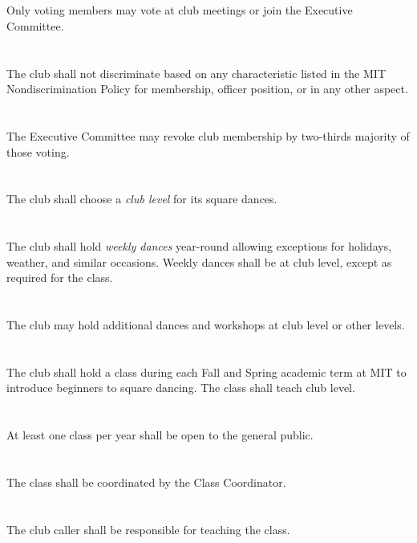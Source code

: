 \documentclass{bylaws}
\begin{document}
\section{}Only voting members may vote at club meetings or join the Executive Committee.
\section{}The club shall not discriminate based on any characteristic listed in the MIT Nondiscrimination Policy for membership, officer position, or in any other aspect.
\section{}The Executive Committee may revoke club membership by two-thirds majority of those voting.


\section{}The club shall choose a \textit{club level} for its square dances.
\section{}The club shall hold \textit{weekly dances} year-round allowing exceptions for holidays, weather, and similar occasions. Weekly dances shall be at club level, except as required for the class.
\section{}The club may hold additional dances and workshops at club level or other levels.


\section{}The club shall hold a class during each Fall and Spring academic term at MIT to introduce beginners to square dancing. The class shall teach club level.
\section{}At least one class per year shall be open to the general public.
\section{}The class shall be coordinated by the Class Coordinator.
\section{}The club caller shall be responsible for teaching the class.
\end{document}
